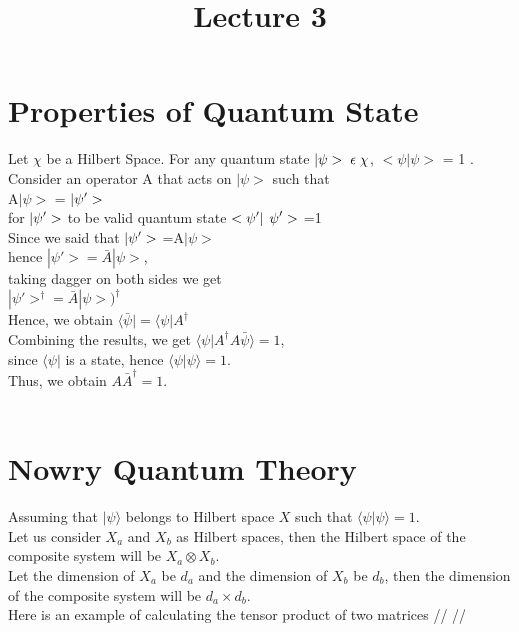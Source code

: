 \documentclass{article}
\title{Lecture 3}
\begin{document}
\maketitle

\section{Properties of Quantum State}


 Let $ \chi $ be a Hilbert Space. For any quantum state  $|\psi> \hspace{1mm}\epsilon \hspace{1mm}\chi $, 
 $<\psi | \psi >$ = 1 . Consider an operator A that acts on $|\psi> $ such that \\ 
 A$|\psi> $ = $|\psi^{\raisebox{0.5pt}{$\scriptstyle\prime$}}> $ \\
 for  $|\psi^{\raisebox{0.5pt}{$\scriptstyle\prime$}}> $ to be valid quantum state  $<\psi^{\raisebox{0.5pt}{$\scriptstyle\prime$}} 
 |$  $\psi^{\raisebox{0.5pt}{$\scriptstyle\prime$}} >$ =1 \\

Since we said that $|\psi^{\raisebox{0.5pt}{$\scriptstyle\prime$}}> $ =A$|\psi> $  \\
 hence $|\psi' >= \bar{A}|\psi>$, \\taking dagger on both sides we get \\$|\psi'>^{\dagger} = \bar{A}|\psi>)^{\dagger}$ \\
 Hence, we obtain $\langle \bar{\psi} | = \langle \psi | A^{\dagger}$ \\
Combining the results, we get $\langle \psi | A^{\dagger} A \bar{\psi} \rangle = 1$,\\
since $\langle \psi |$ is a state, hence $\langle \psi | \psi \rangle = 1$. \\Thus, we obtain $A \bar{A}^{\dagger} = 1$.
\\ 
\\

\section{Nowry Quantum Theory}

Assuming that $|\psi\rangle$ belongs to Hilbert space $X$ such that $\langle \psi|\psi \rangle = 1$.
\\
Let us consider $X_a$ and $X_b$ as Hilbert spaces, then the Hilbert space of the composite system will be $X_a \otimes X_b$.
\\
Let the dimension of $X_a$ be $d_a$ and the dimension of $X_b$ be $d_b$, then the dimension of the composite system will be $d_a \times d_b$.
\\
Here is an example of calculating the tensor product of two matrices // //
\end{document}

